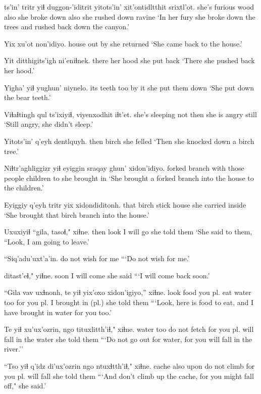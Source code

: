 \documentclass[12pt]{article}
\begin{document}
 ts'in' tritr yiɬ duggon-'iditrit  yitots'in' xit'ontidltthit srixtl'ot.
{she's furious} {} wood also {she broke down} also  {she rushed down} ravine
\glt `In her fury she broke down the trees and rushed back down the canyon.'
\glend 

\gll Yix xu'ot non'idiyo.
house {out by} {she returned}
\glt `She came back to the house.'
\glend 

\gll Yit ditthigits'igh ni'eniɬnek.
there {her hood} {she put back}
\glt `There she pushed back her hood.'
\glend 

\gll Yigha' yiɬ yughun' niynelo.
{its teeth} too {by it} {she put them down}
\glt `She put down the bear teeth.'
\glend 

\gll Viɬaɬtingh qul ts'ixiyiɬ, viyenxodhit iɬt'et. 
{she's sleeping} not then {she is angry} still  
\glt `Still angry, she didn't sleep.'
\glend 

\gll Yitots'in' q'eyh dentlquyh.
then birch {she felled}
\glt  `Then she knocked down a birch tree.'
\glend

\gll Niɬtr'aghliggizr yiɬ eyiggin sraqay ghun' xidon'idiyo. 
{forked branch} with {those people}  children to {she brought in} 
\glt `She brought a forked branch into the house to the children.'
\glend 

\gll Eyiggiy q'eyh tritr yix xidondiditonh.
that  birch stick house {she carried inside}
\glt `She brought that birch branch into the house.'
\glend 

\gll Uxuxiyiɬ ``gila, tasoɬ," xiɬne.
then  look {I will go} {she told them}
\glt `She said to them, ``Look, I am going to leave.'
\glend 

\gll ``Siq'adu'uxt'a'in.
{{do not wish for me}}
\glt ```Do not wish for me.'
\glend 

 ditast'eɬ," yiɬne.
soon   {I will come} {she said}
\glt ```I will come back soon.'
\glend 

\gll ``Gila vav uxɬnonh, te yiɬ yix'oxo xidon'igiyo,'' xiɬne.
look food {you pl. eat} water too {for you pl.} {I brought in (pl.)} {she told them}
\glt ```Look, here is food to eat, and I have brought in water for you too.'
\glend 

\gll Te yiɬ xu'ux'ozrin, ngo tituxlitth'iɬ,"  xiɬne.
water too {do not fetch} for {you pl. will fall in the water} {she told them}
\glt ```Do not go out for water, for you will fall in the river.''
\glend 

\gll ``Tso yiɬ q'idz di'ux'ozrin ngo ntuxɬtth'iɬ," xiɬne.
cache also upon {do not climb} for {you pl. will fall} {she told them}
\glt ```And don't climb up the cache, for you might fall off," she said.'
\glend 
\end{document}
